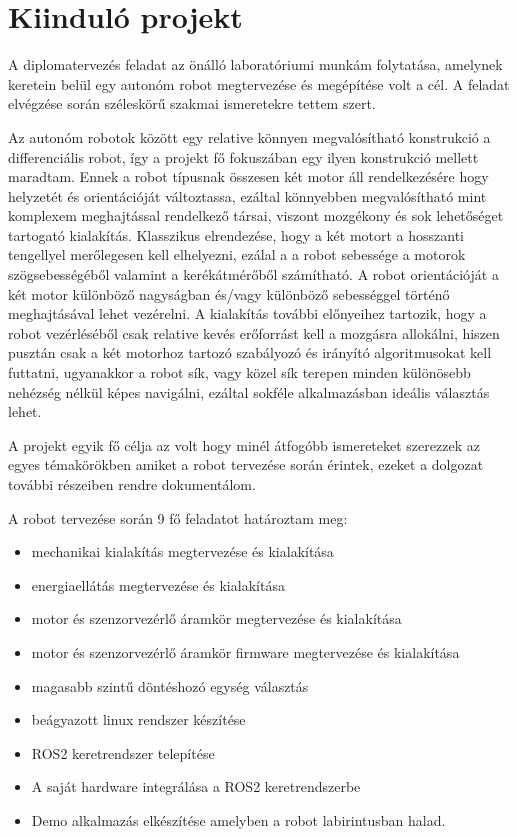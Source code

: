 \chapter{Kiinduló projekt}

A diplomatervezés feladat az önálló laboratóriumi munkám folytatása, amelynek
keretein belül egy autonóm robot megtervezése és megépítése volt a cél.
A feladat elvégzése során széleskörű szakmai ismeretekre tettem szert. 

Az autonóm robotok között egy relative könnyen megvalósítható konstrukció a
differenciális robot, így a projekt fő fokuszában egy ilyen konstrukció  mellett
maradtam. Ennek a robot típusnak összesen két motor áll rendelkezésére hogy
helyzetét és orientációját változtassa, ezáltal  könnyebben megvalósítható mint
komplexem meghajtással rendelkező társai, viszont mozgékony és sok lehetőséget
tartogató kialakítás. Klasszikus elrendezése, hogy a két motort a hosszanti
tengellyel merőlegesen kell elhelyezni, ezálal a  a robot sebessége a motorok
szögsebességéből valamint a kerékátmérőből számítható. A robot orientációját a
két motor különböző nagyságban és/vagy különböző sebességgel történő
meghajtásával lehet vezérelni. A kialakítás további előnyeihez tartozik, hogy a
robot vezérléséből csak relative kevés erőforrást kell a mozgásra allokálni,
hiszen pusztán csak a két motorhoz tartozó szabályozó és irányító algoritmusokat
kell futtatni, ugyanakkor a robot sík, vagy közel sík terepen minden különösebb
nehézség nélkül képes navigálni, ezáltal sokféle alkalmazásban ideális választás
lehet.

A projekt egyik fő célja az volt hogy minél átfogóbb ismereteket szerezzek az
egyes témakörökben amiket a robot tervezése során érintek, ezeket a dolgozat
további részeiben rendre dokumentálom.

A robot tervezése során 9 fő feladatot határoztam meg:

\begin{itemize}
\item mechanikai kialakítás megtervezése és kialakítása
\item energiaellátás megtervezése és kialakítása
\item motor és szenzorvezérlő áramkör megtervezése és kialakítása
\item motor és szenzorvezérlő áramkör firmware megtervezése és kialakítása
\item magasabb szintű döntéshozó egység választás
\item beágyazott linux rendszer készítése
\item ROS2 keretrendszer telepítése
\item A saját hardware integrálása a ROS2 keretrendszerbe
\item Demo alkalmazás elkészítése amelyben a robot labirintusban halad.
\end{itemize}

